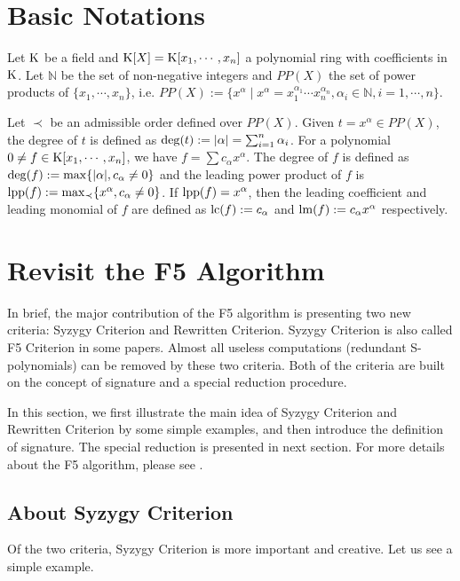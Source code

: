 \documentclass[preprint,authoryear,3p,12pt]{elsarticle}
\def\N{{\mathbb{N}}}
\def\K{{\rm K}}
\def\lm{{\rm lm}}
\def\lpp{{\rm lpp}}
\def\lc{{\rm lc}}
\def\deg{{\rm deg}}
\def\max{{\rm max}}
\def\x{{x_1,\cdots,x_n}}
\begin{document}
\section{Basic Notations}


Let $\K$ be a field and $\K[X]=\K[\x]$ a polynomial ring with
coefficients in $\K$. Let $\N$ be the set of non-negative integers
and $PP(X)$ the set of power products of $\{x_1,\cdots,x_n\}$,
i.e. $PP(X):=\{x^\alpha  \mid x^\alpha=x_1^{\alpha_1}\cdots
x_n^{\alpha_n}, \alpha_i \in \N, i=1,\cdots,n\}$.

Let $\prec$ be an admissible order defined over $PP(X)$. Given
$t=x^{\alpha} \in PP(X)$, the degree of $t$ is defined as
$\deg(t):= |{\alpha}| =\sum_{i=1}^n\alpha_i$. For a polynomial
$0\not=f\in \K[x_1,\cdots,x_n]$, we have $f=\sum
c_{\alpha}x^{\alpha}$. The degree of $f$ is defined as
$\deg(f):=\max\{| \alpha |, c_{\alpha}\not=0\}$ and the leading
power product of $f$ is $\lpp(f):=\max_\prec\{x^{\alpha},
c_{\alpha}\not=0\}$. If $\lpp(f)=x^{\alpha}$, then the leading
coefficient and leading monomial of $f$ are defined as
$\lc(f):=c_{\alpha}$ and $\lm(f):=c_{\alpha}x^{\alpha}$
respectively.



\section{Revisit the F5 Algorithm}


In brief, the major contribution of the F5 algorithm is presenting two new criteria:  Syzygy Criterion and  Rewritten Criterion.
Syzygy Criterion is  also called F5 Criterion in some papers.
   Almost all useless computations (redundant   S-polynomials) can be removed
by these two  criteria. Both of the criteria are built on the concept of signature and a special reduction procedure.

In this section, we first illustrate the main idea of Syzygy Criterion and Rewritten Criterion by some simple examples, and then
introduce the definition of signature. The special reduction is presented in next section. For more details about the F5
algorithm, please see \citep{Fau02}.


\subsection{About Syzygy Criterion} \label{subsec-aboutsyzygy}

Of the two   criteria, Syzygy Criterion is more important and creative. Let us see a simple example.
\end{document}
